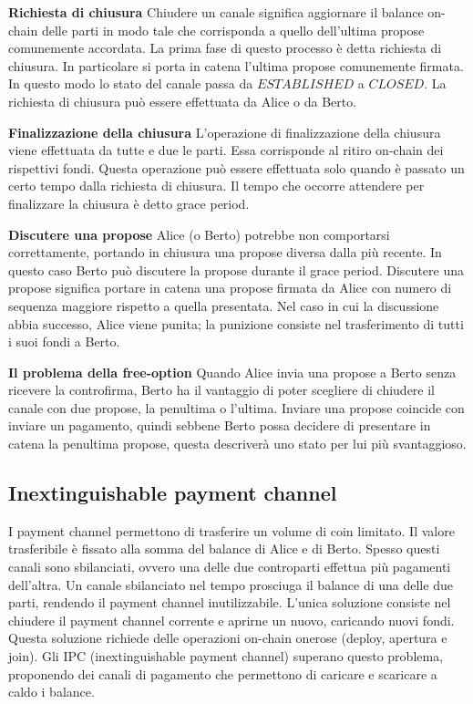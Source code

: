 \documentclass[12pt,italian,]{book}
\begin{document}
\textbf{\textbf{Richiesta di chiusura}} Chiudere un canale significa aggiornare il balance on-chain delle parti in modo tale che corrisponda a quello dell'ultima propose comunemente accordata. La prima fase di questo processo è detta richiesta di chiusura. In particolare si porta in catena l'ultima propose comunemente firmata. In questo modo lo stato del canale passa da \(ESTABLISHED\) a \(CLOSED\). La richiesta di chiusura può essere effettuata da Alice o da Berto.

\textbf{\textbf{Finalizzazione della chiusura}} L'operazione di finalizzazione della chiusura viene effettuata da tutte e due le parti. Essa corrisponde al ritiro on-chain dei rispettivi fondi. Questa operazione può essere effettuata solo quando è passato un certo tempo dalla richiesta di chiusura. Il tempo che occorre attendere per finalizzare la chiusura è detto grace period.

\textbf{\textbf{Discutere una propose}} Alice (o Berto) potrebbe non comportarsi correttamente, portando in chiusura una propose diversa dalla più recente. In questo caso Berto può discutere la propose durante il grace period. Discutere una propose significa portare in catena una propose firmata da Alice con numero di sequenza maggiore rispetto a quella presentata. Nel caso in cui la discussione abbia successo, Alice viene punita; la punizione consiste nel trasferimento di tutti i suoi fondi a Berto.

\textbf{\textbf{Il problema della free-option}} Quando Alice invia una propose a Berto senza ricevere la controfirma, Berto ha il vantaggio di poter scegliere di chiudere il canale con due propose, la penultima o l'ultima. Inviare una propose coincide con inviare un pagamento, quindi sebbene Berto possa decidere di presentare in catena la penultima propose, questa descriverà uno stato per lui più svantaggioso.

\hypertarget{inextinguishable-payment-channel}{%
\subsection{Inextinguishable payment channel}\label{inextinguishable-payment-channel}}

I payment channel permettono di trasferire un volume di coin limitato. Il valore trasferibile è fissato alla somma del balance di Alice e di Berto. Spesso questi canali sono sbilanciati, ovvero una delle due controparti effettua più pagamenti dell'altra. Un canale sbilanciato nel tempo prosciuga il balance di una delle due parti, rendendo il payment channel inutilizzabile. L'unica soluzione consiste nel chiudere il payment channel corrente e aprirne un nuovo, caricando nuovi fondi. Questa soluzione richiede delle operazioni on-chain onerose (deploy, apertura e join). Gli IPC (inextinguishable payment channel) superano questo problema, proponendo dei canali di pagamento che permettono di caricare e scaricare a caldo i balance.
\end{document}

